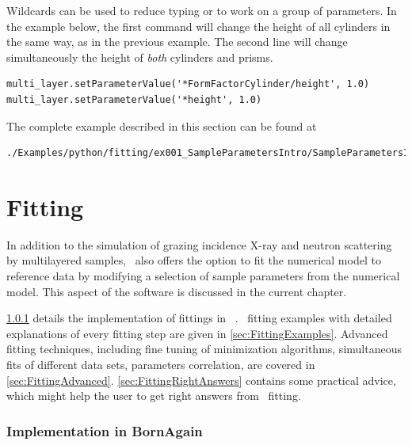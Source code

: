 Wildcards  can be used to reduce typing or to work on a group
of parameters. In the example below, the first command will change the
height of all cylinders in the same way, as in the previous example. The second line will change simultaneously the height of {\it both} cylinders and prisms.
\begin{lstlisting}[language=shell, style=commandline]
multi_layer.setParameterValue('*FormFactorCylinder/height', 1.0)
multi_layer.setParameterValue('*height', 1.0)
\end{lstlisting}

The complete example described in this section can be found at
\begin{lstlisting}[language=shell, style=commandline]
./Examples/python/fitting/ex001_SampleParametersIntro/SampleParametersIntro.py
\end{lstlisting}

\section{Fitting} \label{sec:Fitting}

In addition to the simulation of grazing incidence
X-ray and neutron scattering by
multilayered samples, \BornAgain\ also offers the option to
fit the numerical model to reference data by modifying a selection of
sample parameters from the numerical model.  This aspect
of the software is discussed in the current chapter.

\cref{sec:FittingImplementation} details the
implementation of fittings in \BornAgain\ .
\Python\ fitting examples with detailed
explanations of every fitting step are given in \cref{sec:FittingExamples}. Advanced fitting techniques, including fine tuning of minimization
algorithms, simultaneous fits of different data sets, parameters
correlation, are covered in
\cref{sec:FittingAdvanced}. \cref{sec:FittingRightAnswers} contains some practical advice, which might
help the user to get right answers from \BornAgain\ fitting.


\subsubsection{Implementation in BornAgain} \label{sec:FittingImplementation}

